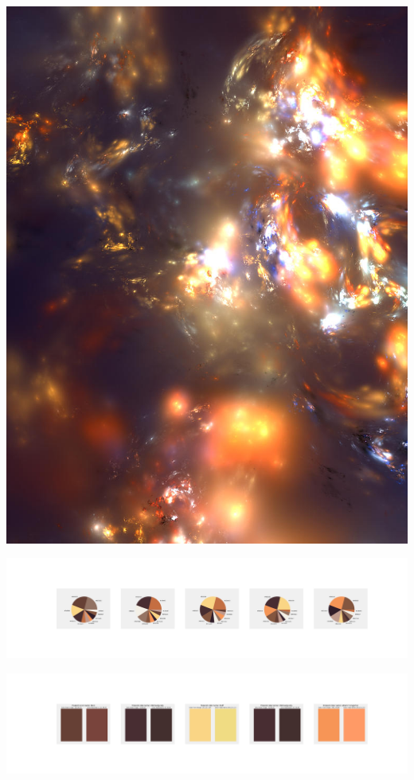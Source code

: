 \documentclass[11pt]{article}
\begin{document}
\begin{landscape}
    \begin{center}
    \includegraphics[width=\textwidth]{./nbimg/file (216).jpg}
    \end{center}

    \begin{center}
    \includegraphics[width=250mm]{./nbimg/pie-130.jpg}
    \end{center}

    \begin{center}
    \includegraphics[width=250mm]{./nbimg/peak-130.jpg}
    \end{center}
    


\end{landscape}
\end{document}
